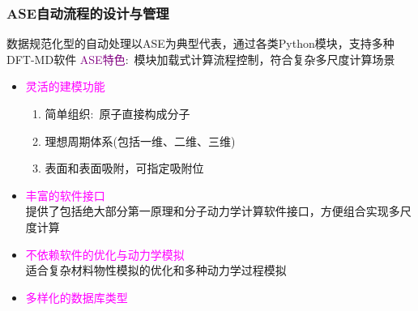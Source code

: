 {{\frame
{
	\frametitle{\textrm{ASE}自动流程的设计与管理}
数据规范化型的自动处理以\textrm{ASE}为典型代表，通过各类\textrm{Python}模块，支持多种\textrm{DFT-MD}软件%
\vskip 3pt
		\textcolor{purple}{\textrm{ASE}特色}:~模块加载式计算流程控制，符合复杂多尺度计算场景
		\begin{itemize}
			\item \textcolor{magenta}{灵活的建模功能}
				\begin{enumerate}
    \setlength{\itemsep}{7pt}
					\item 简单组织:~原子直接构成分子
					\item 理想周期体系(包括一维、二维、三维)
					\item 表面和表面吸附，可指定吸附位
				\end{enumerate}
			\item \textcolor{magenta}{丰富的软件接口}\\
				提供了包括绝大部分第一原理和分子动力学计算软件接口，方便组合实现多尺度计算
			\item \textcolor{magenta}{不依赖软件的优化与动力学模拟}\\
				适合复杂材料物性模拟的优化和多种动力学过程模拟
			\item \textcolor{magenta}{多样化的数据库类型}
		\end{itemize} 
}

}}

